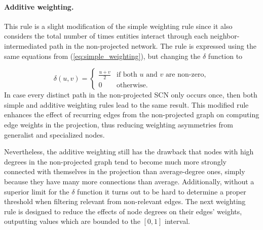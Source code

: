 {\paragraph*{Additive weighting.}
This rule is a slight modification of the simple weighting rule since it also considers the total number of times entities interact through each neighbor-intermediated path in the non-projected network. The rule is expressed using the same equations from (\ref{eq:simple_weighting}), but changing the $\delta$ function to
 
$$\delta(u,v) = 
\begin{cases}
\frac{u+v}{2} &  \mbox{if both } u \mbox{ and } v \mbox{ are non-zero},\\
0 & \mbox{otherwise}.
\end{cases}
$$
In case every distinct path in the non-projected SCN only occurs once, then both simple and additive weighting rules lead to the same result. %
This modified rule enhances the effect of recurring edges from the non-projected graph on computing edge weights in the projection, thus reducing weighting asymmetries from generalist and specialized nodes.

Nevertheless, the additive weighting still has the drawback that nodes with high degrees in the non-projected graph tend to become much more strongly connected with themselves in the projection than average-degree ones, simply because they have many more connections than average.
Additionally, without a superior limit for the $\delta$ function it turns out to be hard to determine a proper threshold when filtering relevant from non-relevant edges. The next weighting rule is designed to reduce the effects of node degrees on their edges' weights, outputting values which are bounded to the $[0,1]$ interval.


}
